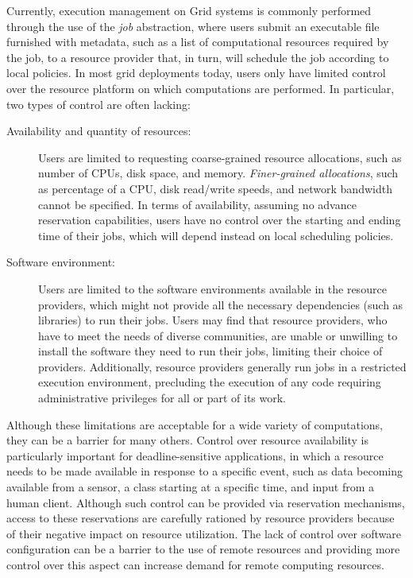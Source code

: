 Currently, execution management on Grid systems is commonly performed through the use of the \emph{job} abstraction, where users submit an executable file furnished with metadata, such as a list of computational resources required by the job, to a resource provider that, in turn, will schedule the job according to local policies. In most grid deployments today, users only have limited control over the resource platform on which computations are performed. In particular, two types of control are often lacking:

\begin{description}
\item[Availability and quantity of resources:] Users are limited to requesting coarse-grained resource allocations, such as number of CPUs, disk space, and memory. \emph{Finer-grained allocations}, such as percentage of a CPU, disk read/write speeds, and network bandwidth cannot be specified. In terms of availability, assuming no advance reservation capabilities, users have no control over the starting and ending time of their jobs, which will depend instead on local scheduling policies.
\item[Software environment:] Users are limited to the software environments available in the resource providers, which might not provide all the necessary dependencies (such as libraries) to run their jobs. Users may find that resource providers, who have to meet the needs of diverse communities, are unable or unwilling to install the software they need to run their jobs, limiting their choice of providers. Additionally, resource providers generally run jobs in a restricted execution environment, precluding the execution of any code requiring administrative privileges for all or part of its work.
\end{description}

Although these limitations are acceptable for a wide variety of computations, they can be a barrier for many others. Control over resource availability is particularly important for deadline{}-sensitive applications, in which a resource needs to be made available in response to a specific event, such as data becoming available from a sensor, a class starting at a specific time, and input from a human client. Although such control can be provided via reservation mechanisms, access to these reservations are carefully rationed by resource providers because of their negative impact on resource utilization. The lack of control over software configuration can be a barrier to the use of remote resources and providing more control over this aspect can increase demand for remote computing resources.

